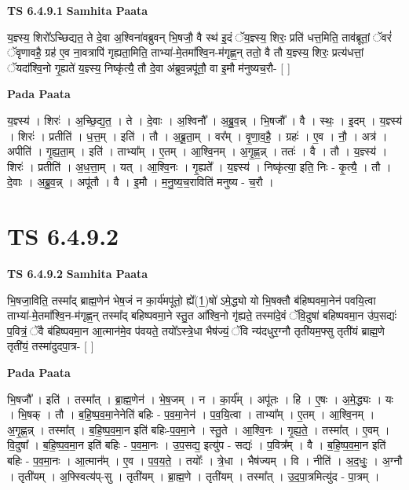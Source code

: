 \documentclass[17pt]{extarticle}
\begin{document}
\textbf{TS 6.4.9.1 } \newline
\textbf{Samhita Paata} \newline

य॒ज्ञ्स्य॒ शिरो᳚ऽच्छिद्यत॒ ते दे॒वा अ॒श्विना॑वब्रुवन् भि॒षजौ॒ वै स्थ॑ इ॒दं ॅय॒ज्ञ्स्य॒ शिरः॒ प्रति॑ धत्त॒मिति॒ ताव॑ब्रूतां॒ ॅवरं॑ ॅवृणावहै॒ ग्रह॑ ए॒व ना॒वत्रापि॑ गृह्यता॒मिति॒ ताभ्या॑-मे॒तमा᳚श्वि॒न-म॑गृह्ण॒न् ततो॒ वै तौ य॒ज्ञ्स्य॒ शिरः॒ प्रत्य॑धत्तां॒ ॅयदा᳚श्वि॒नो गृ॒ह्यते॑ य॒ज्ञ्स्य॒ निष्कृ॑त्यै॒ तौ दे॒वा अ॑ब्रुव॒न्नपू॑तौ॒ वा इ॒मौ म॑नुष्यच॒रौ- [  ] \newline

\textbf{Pada Paata} \newline

य॒ज्ञ्स्य॑ । शिरः॑ । अ॒च्छि॒द्य॒त॒ । ते । दे॒वाः । अ॒श्विनौ᳚ । अ॒ब्रु॒व॒न्न् । भि॒षजौ᳚ । वै । स्थः॒ । इ॒दम् । य॒ज्ञ्स्य॑ । शिरः॑ । प्रतीति॑ । ध॒त्त॒म् । इति॑ । तौ । अ॒ब्रू॒ता॒म् । वर᳚म् । वृ॒णा॒व॒है॒ । ग्रहः॑ । ए॒व । नौ॒ । अत्र॑ । अपीति॑ । गृ॒ह्य॒ता॒म् । इति॑ । ताभ्या᳚म् । ए॒तम् । आ॒श्वि॒नम् । अ॒गृ॒ह्ण॒न्न् । ततः॑ । वै । तौ । य॒ज्ञ्स्य॑ । शिरः॑ । प्रतीति॑ । अ॒ध॒त्ता॒म् । यत् । आ॒श्वि॒नः । गृ॒ह्यते᳚ । य॒ज्ञ्स्य॑ । निष्कृ॑त्या॒ इति॒ निः - कृ॒त्यै॒ । तौ । दे॒वाः । अ॒ब्रु॒व॒न्न् । अपू॑तौ । वै । इ॒मौ । म॒नु॒ष्य॒च॒राविति॑ मनुष्य - च॒रौ ।  \newline





\section{ TS 6.4.9.2 }

\textbf{TS 6.4.9.2 } \newline
\textbf{Samhita Paata} \newline

भि॒षजा॒विति॒ तस्मा᳚द् ब्राह्म॒णेन॑ भेष॒जं न का॒र्य॑मपू॑तो॒ ह्ये᳚(1॒)षो॑ ऽमे॒द्ध्यो यो भि॒षक्तौ ब॑हिष्पवमा॒नेन॑ पवयि॒त्वा ताभ्या॑-मे॒तमा᳚श्वि॒न-म॑गृह्ण॒न् तस्मा᳚द् बहिष्पवमा॒ने स्तु॒त आ᳚श्वि॒नो गृ॑ह्यते॒ तस्मा॑दे॒वं ॅवि॒दुषा॑ बहिष्पवमा॒न उ॑प॒सद्यः॑ प॒वित्रं॒ ॅवै ब॑हिष्पवमा॒न आ॒त्मान॑मे॒व प॑वयते॒ तयो᳚ऽस्त्रे॒धा भैष॑ज्यं॒ ॅवि न्य॑दधुर॒ग्नौ तृती॑यम॒फ्सु तृती॑यं ब्राह्म॒णे तृती॑यं॒ तस्मा॑दुदपा॒त्र- [  ] \newline

\textbf{Pada Paata} \newline

भि॒षजौ᳚ । इति॑ । तस्मा᳚त् । ब्रा॒ह्म॒णेन॑ । भे॒ष॒जम् । न । का॒र्य᳚म् । अपू॑तः । हि । ए॒षः । अ॒मे॒द्ध्यः । यः । भि॒षक् । तौ । ब॒हि॒ष्प॒व॒मा॒नेनेति॑ बहिः - प॒व॒मा॒नेन॑ । प॒व॒यि॒त्वा । ताभ्या᳚म् । ए॒तम् । आ॒श्वि॒नम् । अ॒गृ॒ह्ण॒न्न् । तस्मा᳚त् । ब॒हि॒ष्प॒व॒मा॒न इति॑ बहिः-प॒व॒मा॒ने । स्तु॒ते । आ॒श्वि॒नः । गृ॒ह्य॒ते॒ । तस्मा᳚त् । ए॒वम् । वि॒दुषा᳚ । ब॒हि॒ष्प॒व॒मा॒न इति॑ बहिः - प॒व॒मा॒नः । उ॒प॒सद्य॒ इत्यु॑प - सद्यः॑ । प॒वित्र᳚म् । वै । ब॒हि॒ष्प॒व॒मा॒न इति॑ बहिः - प॒व॒मा॒नः । आ॒त्मान᳚म् । ए॒व । प॒व॒य॒ते॒ । तयोः᳚ । त्रे॒धा । भैष॑ज्यम् । वि । नीति॑ । अ॒द॒धुः॒ । अ॒ग्नौ । तृती॑यम् । अ॒फ्स्वित्य॑प्-सु । तृती॑यम् । ब्रा॒ह्म॒णे । तृती॑यम् । तस्मा᳚त् । उ॒द॒पा॒त्रमित्यु॑द - पा॒त्रम् ।  \newline
\end{document}

